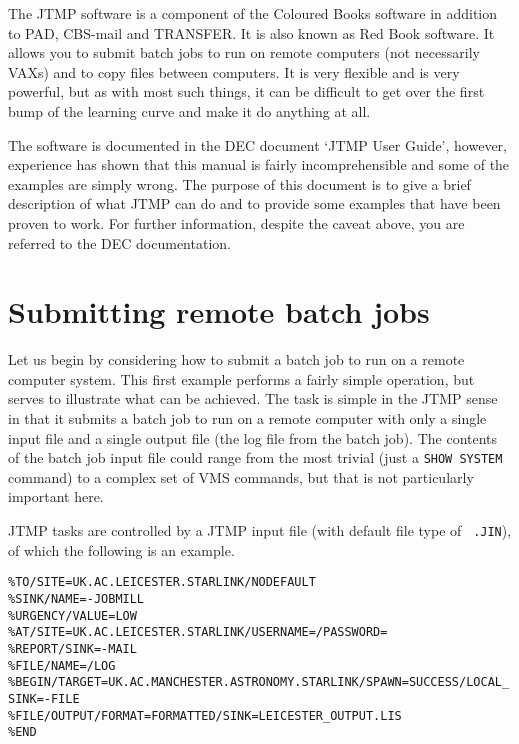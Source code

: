The JTMP software is a component of the Coloured Books software in addition to
PAD, CBS-mail and TRANSFER. It is also  known as Red Book software. It allows
you to submit batch jobs to run on remote computers (not necessarily VAXs) and
to copy files between computers. It is very flexible and is very powerful, but
as with most such things, it can be difficult to get over the first bump of the
learning curve and make it do anything at all.

The software is documented in the DEC document `JTMP User Guide', however,
experience has shown that this manual is fairly incomprehensible and some of
the examples are simply wrong. The purpose of this document is to give a brief
description of what JTMP can do and to provide some examples that have been
proven to work. For further information, despite the caveat above, you are
referred to the DEC documentation.

\section{Submitting remote batch jobs}

Let us begin by considering how to submit a batch job to run on a remote
computer system. This first example performs a fairly simple operation, but
serves to illustrate what can be achieved. The task is simple in the JTMP sense
in that it submits a batch job to run on a remote computer with only a single
input file and a single output file (the log file from the batch job). The
contents of the batch job input file could range from the most trivial (just a
{\tt SHOW SYSTEM} command) to a complex set of VMS commands, but that is not
particularly important here.

JTMP tasks are controlled by a JTMP input file (with default file type of {\tt
.JIN}), of which the following is an example.

\vspace{5mm}

\verb#%TO/SITE=UK.AC.LEICESTER.STARLINK/NODEFAULT                                         # \\
\verb#%SINK/NAME=-JOBMILL                                                                 # \\
\verb#%URGENCY/VALUE=LOW                                                                  # \\
\verb#%AT/SITE=UK.AC.LEICESTER.STARLINK/USERNAME=/PASSWORD=                               # \\
\verb#%REPORT/SINK=-MAIL                                                                  # \\
\verb#%FILE/NAME=/LOG                                                                     # \\
\verb#%BEGIN/TARGET=UK.AC.MANCHESTER.ASTRONOMY.STARLINK/SPAWN=SUCCESS/LOCAL_SINK=-FILE    # \\
\verb#%FILE/OUTPUT/FORMAT=FORMATTED/SINK=LEICESTER_OUTPUT.LIS                             # \\
\verb#%END                                                                                # \\

